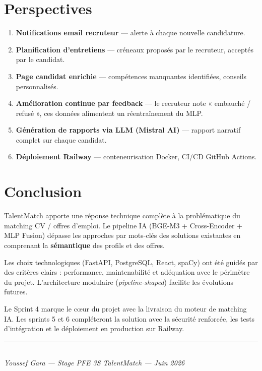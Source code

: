 \documentclass[12pt,a4paper]{report}
\begin{document}
\chapter{Perspectives}

\begin{enumerate}
  \item \textbf{Notifications email recruteur} — alerte à chaque nouvelle candidature.
  \item \textbf{Planification d'entretiens} — créneaux proposés par le recruteur, acceptés par le candidat.
  \item \textbf{Page candidat enrichie} — compétences manquantes identifiées, conseils personnalisés.
  \item \textbf{Amélioration continue par feedback} — le recruteur note « embauché / refusé »,
        ces données alimentent un réentraînement du MLP.
  \item \textbf{Génération de rapports via LLM (Mistral AI)} — rapport narratif complet sur chaque candidat.
  \item \textbf{Déploiement Railway} — conteneurisation Docker, CI/CD GitHub Actions.
\end{enumerate}

\chapter*{Conclusion}

TalentMatch apporte une réponse technique complète à la problématique du matching
CV / offres d'emploi. Le pipeline IA (BGE-M3 + Cross-Encoder + MLP Fusion) dépasse
les approches par mots-clés des solutions existantes en comprenant la \textbf{sémantique}
des profils et des offres.

Les choix technologiques (FastAPI, PostgreSQL, React, spaCy) ont été guidés par des
critères clairs : performance, maintenabilité et adéquation avec le périmètre du projet.
L'architecture modulaire (\textit{pipeline-shaped}) facilite les évolutions futures.

Le Sprint 4 marque le cœur du projet avec la livraison du moteur de matching IA.
Les sprints 5 et 6 compléteront la solution avec la sécurité renforcée, les tests
d'intégration et le déploiement en production sur Railway.

\vspace{1cm}
\begin{center}
{\color{navyblue}\rule{0.5\textwidth}{0.5pt}}\\[0.3cm]
\textit{Youssef Gara — Stage PFE 3S TalentMatch — Juin 2026}
\end{center}
\end{document}

